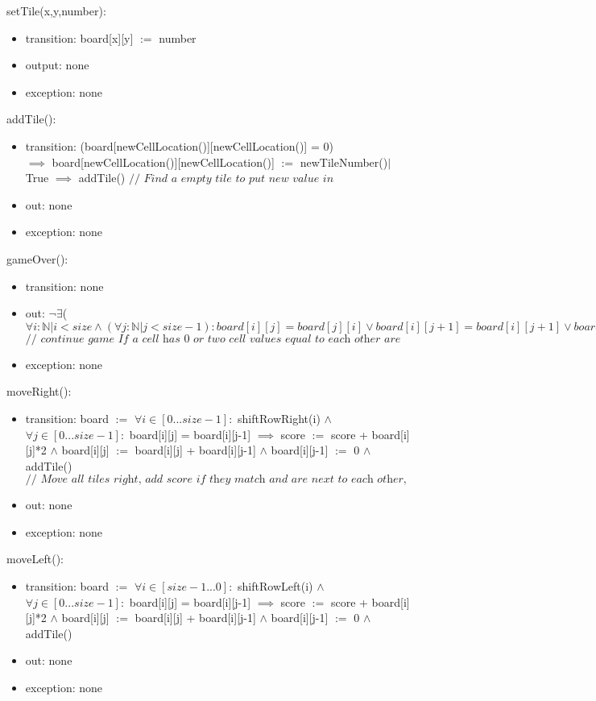 \documentclass[12pt]{article}
\begin{document}
setTile(x,y,number): 
\begin{itemize}
    \item transition: board[x][y] $:=$ number
    \item output: none
    \item exception: none
\end{itemize}





addTile(): 
\begin{itemize}
    \item transition: (board[newCellLocation()][newCellLocation()] = 0)\\ $\implies$ board[newCellLocation()][newCellLocation()] $:=$ newTileNumber()$|$True $\implies$ addTile() $\textit{// Find a empty tile to put new value in}$
    \item out: none
    \item exception: none
\end{itemize}
gameOver(): 
\begin{itemize}
    \item transition: none
    \item out: $\lnot \exists$($\forall i : \mathbb{N}|i < size \land (\forall j : \mathbb{N}| j < size-1):board[i][j] = board[j][i] \lor board[i][j+1] = board[i][j+1] \lor board[i][j] = 0)$ \\ $\textit{// continue game If a cell has 0 or two cell values equal to each other are next to each other }$
    \item exception: none
\end{itemize}
moveRight(): 
\begin{itemize}
    \item transition: board $:=$ $\forall i \in [0...size-1]:$ shiftRowRight(i) $\land$ $\forall j \in [0...size-1]:$ board[i][j] = board[i][j-1] $\implies$ score $:=$ score + board[i][j]*2 $\land$ board[i][j] $:=$ board[i][j] + board[i][j-1] $\land$ board[i][j-1] $:=$ 0 $\land$ addTile() \\
    $\textit{// Move all tiles right, add score if they match and are next to each other, add new tile after}$
    \item out: none
    \item exception: none
\end{itemize}
moveLeft(): 
\begin{itemize}
    \item transition: board $:=$ $\forall i \in [size-1...0]:$ shiftRowLeft(i) $\land$ $\forall j \in [0...size-1]:$ board[i][j] = board[i][j-1] $\implies$ score $:=$ score + board[i][j]*2 $\land$ board[i][j] $:=$ board[i][j] + board[i][j-1] $\land$ board[i][j-1] $:=$ 0 $\land$ addTile()
    \item out: none
    \item exception: none
\end{itemize}
\end{document}
